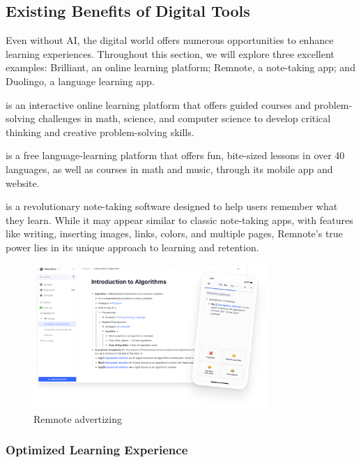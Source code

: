 \documentclass{article}
\begin{document}
\subsection{Existing Benefits of Digital Tools}

Even without AI, the digital world offers numerous opportunities
to enhance learning experiences. Throughout this section,
we will explore three excellent examples: Brilliant,
an online learning platform; Remnote, a note-taking app;
and Duolingo, a language learning app.

\cite[Brilliant]{brilliant} is an interactive online learning platform that
offers guided courses and problem-solving challenges
in math, science, and computer science to develop
critical thinking and creative problem-solving skills.

\cite[Duolingo]{duolingo} is a free language-learning platform
that offers fun, bite-sized lessons in over 40 languages,
as well as courses in math and music, through its mobile app and website.

\cite[Remnote]{remnote} is a revolutionary note-taking
software designed to help users remember what they learn.
While it may appear similar to classic note-taking apps,
with features like writing, inserting images, links, colors,
and multiple pages, Remnote's true power lies in its unique
approach to learning and retention.

\begin{figure}[h]
    \centering
    \includegraphics[width=0.8\textwidth]{./images/remnote_ad.png}
    \caption{Remnote advertizing \cite{remnote}}
\end{figure}

\subsubsection{Optimized Learning Experience}
\end{document}

